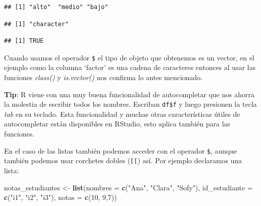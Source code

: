 \documentclass[
]{book}
\newenvironment{Shaded}{\begin{snugshade}}{\end{snugshade}}
\newcommand{\AttributeTok}[1]{\textcolor[rgb]{0.13,0.29,0.53}{#1}}
\newcommand{\DecValTok}[1]{\textcolor[rgb]{0.00,0.00,0.81}{#1}}
\newcommand{\FunctionTok}[1]{\textcolor[rgb]{0.13,0.29,0.53}{\textbf{#1}}}
\newcommand{\NormalTok}[1]{#1}
\newcommand{\OtherTok}[1]{\textcolor[rgb]{0.56,0.35,0.01}{#1}}
\newcommand{\SpecialCharTok}[1]{\textcolor[rgb]{0.81,0.36,0.00}{\textbf{#1}}}
\newcommand{\StringTok}[1]{\textcolor[rgb]{0.31,0.60,0.02}{#1}}
\begin{document}
\begin{Shaded}
\end{Shaded}

\begin{verbatim}
## [1] "alto"  "medio" "bajo"
\end{verbatim}

\begin{Shaded}
\end{Shaded}

\begin{verbatim}
## [1] "character"
\end{verbatim}

\begin{Shaded}
\end{Shaded}

\begin{verbatim}
## [1] TRUE
\end{verbatim}

Cuando usamos el operador \texttt{\$} el tipo de objeto que obtenemos es un vector, en el ejemplo como la columna `factor' es una cadena de caracteres entonces al usar las funciones \emph{class()} y \emph{is.vector()} nos confirma lo antes mencionado.

\textbf{Tip}: R viene con una muy buena funcionalidad de autocompletar que nos ahorra la molestia de escribir todos los nombres.
Escriban \texttt{df\$f} y luego presionen la tecla \emph{tab} en su teclado.
Esta funcionalidad y muchas otras características útiles de autocompletar están disponibles en RStudio, esto aplica también para las funciones.

En el caso de las listas también podemos acceder con el operador \texttt{\$}, aunque también podemos usar corchetes dobles (\texttt{{[}{[}}) así.
Por ejemplo declaramos una lista:

\begin{Shaded}
\begin{Highlighting}[]
\NormalTok{notas\_estudiantes }\OtherTok{\textless{}{-}} \FunctionTok{list}\NormalTok{(}\AttributeTok{nombres =} \FunctionTok{c}\NormalTok{(}\StringTok{"Ana"}\NormalTok{, }\StringTok{"Clara"}\NormalTok{, }\StringTok{"Sofy"}\NormalTok{),}
               \AttributeTok{id\_estudiante =} \FunctionTok{c}\NormalTok{(}\StringTok{"i1"}\NormalTok{, }\StringTok{"i2"}\NormalTok{, }\StringTok{"i3"}\NormalTok{),}
               \AttributeTok{notas =} \FunctionTok{c}\NormalTok{(}\DecValTok{10}\NormalTok{, }\DecValTok{9}\NormalTok{,}\DecValTok{7}\NormalTok{))}
\end{Highlighting}
\end{Shaded}
\end{document}
